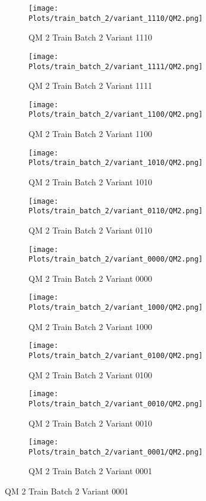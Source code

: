 \documentclass{DissertateFigs}
\begin{document}
\begin{figure}[t!]
    \begin{subfigure}{0.47\textwidth}
    \texttt{[image: Plots/train\_batch\_2/variant\_1110/QM2.png]}
    \caption{QM 2 Train Batch 2 Variant 1110}
    \end{subfigure}
    \begin{subfigure}{0.47\textwidth}
    \texttt{[image: Plots/train\_batch\_2/variant\_1111/QM2.png]}
    \caption{QM 2 Train Batch 2 Variant 1111}
    \end{subfigure}

\medskip

    \begin{subfigure}{0.47\textwidth}
    \texttt{[image: Plots/train\_batch\_2/variant\_1100/QM2.png]}
    \caption{QM 2 Train Batch 2 Variant 1100}
    \end{subfigure}
    \begin{subfigure}{0.47\textwidth}
    \texttt{[image: Plots/train\_batch\_2/variant\_1010/QM2.png]}
    \caption{QM 2 Train Batch 2 Variant 1010}
    \end{subfigure}

\medskip

    \begin{subfigure}{0.47\textwidth}
    \texttt{[image: Plots/train\_batch\_2/variant\_0110/QM2.png]}
    \caption{QM 2 Train Batch 2 Variant 0110}
    \end{subfigure}
    \begin{subfigure}{0.47\textwidth}
    \texttt{[image: Plots/train\_batch\_2/variant\_0000/QM2.png]}
    \caption{QM 2 Train Batch 2 Variant 0000}
    \end{subfigure}

\medskip

    \begin{subfigure}{0.47\textwidth}
    \texttt{[image: Plots/train\_batch\_2/variant\_1000/QM2.png]}
    \caption{QM 2 Train Batch 2 Variant 1000}
    \end{subfigure}
    \begin{subfigure}{0.47\textwidth}
    \texttt{[image: Plots/train\_batch\_2/variant\_0100/QM2.png]}
    \caption{QM 2 Train Batch 2 Variant 0100}
    \end{subfigure}

\medskip

    \begin{subfigure}{0.47\textwidth}
    \texttt{[image: Plots/train\_batch\_2/variant\_0010/QM2.png]}
    \caption{QM 2 Train Batch 2 Variant 0010}
    \end{subfigure}
    \begin{subfigure}{0.47\textwidth}
    \texttt{[image: Plots/train\_batch\_2/variant\_0001/QM2.png]}
    \caption{QM 2 Train Batch 2 Variant 0001}
    \end{subfigure}


\end{figure}
\end{document}
